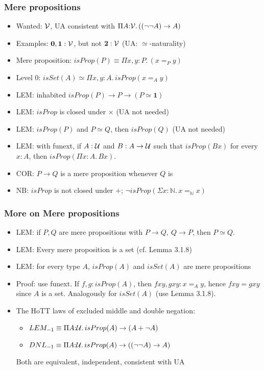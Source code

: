 \documentclass[handout]{beamer}
\newcommand{\depi}[3]{\Pi{#1{:}#2.\,#3}}
\newcommand{\sigm}[3]{\Sigma{#1{:}#2.\,#3}}
\newcommand{\Nat}{\mathbb{N}}
\newcommand{\UU}{{\cal U}}
\newcommand{\VV}{{\cal V}}
\newcommand{\bfnull}{\mathbf{0}}
\newcommand{\bfone}{\mathbf{1}}
\newcommand{\bftwo}{\mathbf{2}}
\begin{document}
 \frame
  {

    \frametitle{Mere propositions}

    \begin{itemize}[<+->]
    \item Wanted: $\VV$, UA consistent with
          $\depi{A}{\VV}{((\neg \neg A) \to A)}$
    \item Examples: $\bfnull,\bfone:\VV$, but not $\bftwo:\VV$ (UA: $\simeq$-naturality)
    \item Mere proposition: $isProp(P)\equiv \depi{x,y}{P}{(x=_P y)}$
    \item Level $0$: $isSet(A)\simeq \depi{x,y}{A}{isProp(x=_A y)}$
    \item LEM: inhabited $isProp(P)\to P\to(P\simeq\bfone)$
    \item LEM: $isProp$ is closed under $\times$ (UA not needed)
    \item LEM: $isProp(P)$ and $P\simeq Q$, then $isProp(Q)$ (UA not needed)
    \item LEM: with funext, if $A:\UU$ and $B:A\to\UU$ such that 
          $isProp(Bx)$ for every $x:A$, then $isProp(\depi{x}{A}{Bx})$.
    \item COR: $P\to Q$ is a mere proposition whenever $Q$ is
    \item NB: $isProp$ is not closed under $+$; $\neg isProp(\sigm{x}{\Nat}{x=_\Nat x})$
    \end{itemize}
  }

\frame
  {

    \frametitle{More on Mere propositions}

    \begin{itemize}[<+->]
    \item LEM: if $P,Q$ are mere propositions with $P\to Q,~Q\to P$, 
          then $P\simeq Q$.
    \item LEM: Every mere proposition is a set (cf. Lemma 3.1.8)
    \item LEM: for every type $A$, $isProp(A)$ and $isSet(A)$ are mere propositions
    \item Proof: use funext. If $f,g:isProp(A)$, then $fxy,gxy: x=_A y$, hence
          $fxy=gxy$ since $A$ is a set. Analogously for $isSet(A)$ (use Lemma 3.1.8).
    \item The HoTT laws of excluded middle and double negation:
      \begin{itemize}[<+->]   
      \item $LEM_{-1}\equiv\depi{A}{\UU}{isProp(A)\to(A+ \neg A)}$
      \item $DNL_{-1}\equiv\depi{A}{\UU}{isProp(A)\to((\neg \neg A) \to A)}$
      \end{itemize}
      Both are equivalent, independent, consistent with UA
    \end{itemize}
  }
\end{document}
